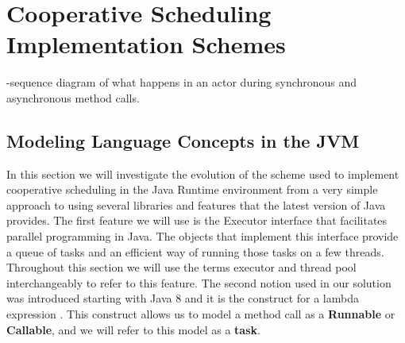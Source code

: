 \section{Cooperative Scheduling Implementation Schemes}
\label{scheme}
-sequence diagram of what happens in an actor during synchronous and asynchronous method calls.

\subsection{Modeling Language Concepts in the JVM}
In this section we will investigate the evolution of the scheme used to implement cooperative scheduling in the Java Runtime environment from a very simple approach to using several libraries and features that the latest version of Java provides. The first feature we will use is the Executor interface \cite{execserv} that facilitates parallel programming in Java. The objects that implement this interface provide a queue of tasks and an efficient way of running those tasks on a few threads. Throughout this section we will use the terms executor and thread pool interchangeably to refer to this feature. The second notion used in our solution was introduced starting with Java 8 and it is the construct for a lambda expression \cite{lambdas}. This construct allows us to model a method call as a \textbf{Runnable} or \textbf{Callable}, and we will refer to this model as a \textbf{task}. 




